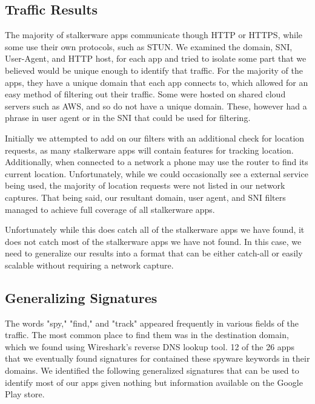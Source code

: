 \documentclass[acmtog]{acmart}
\begin{document}
\subsection{Traffic Results}

The majority of stalkerware apps communicate though HTTP or HTTPS, while some 
use their own protocols, such as STUN. We examined the domain, SNI, User-Agent, and HTTP 
host, for each app and tried to isolate some part that we believed would be unique enough to identify that traffic. For the majority of the apps, they have a unique domain that each app connects to, which allowed for an easy method of filtering out their traffic. Some were hosted on shared cloud servers such as AWS, and so do not have a unique domain. These, however had a phrase in user agent or in the SNI that could be used for filtering.

Initially we attempted to add on our filters with an additional check for location requests, as many stalkerware apps will contain features for tracking location. Additionally, when connected to a network a phone may use the router to find its current location. Unfortunately, while we could occasionally see a external service being used, the majority of location requests were not listed in our network captures. That being said, our resultant domain, user agent, and SNI filters managed to achieve full coverage of all stalkerware apps.


 
 Unfortunately while this does catch all of the stalkerware apps we have found, it does not catch most of the stalkerware apps we have not found. In this case, we need to generalize our results into a format that can be either catch-all or easily scalable without requiring a network capture.

\subsection{Generalizing Signatures}

The words "spy," "find," and "track" appeared frequently in 
various fields of the traffic. The most common place to find them was in the 
destination domain, which we found using Wireshark's reverse DNS lookup tool. 
12 of the 26 apps that we eventually found signatures for contained these 
spyware keywords in their domains. We identified the following generalized 
signatures that can be used to identify most of our apps given nothing but 
information available on the Google Play store.
\end{document}
